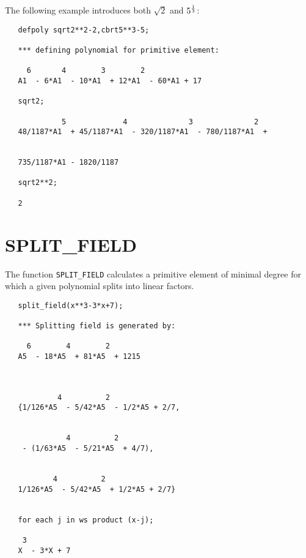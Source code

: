 The following example introduces both $\sqrt 2$ and $5^{1 \over 3}$:

\begin{verbatim}
   defpoly sqrt2**2-2,cbrt5**3-5;

   *** defining polynomial for primitive element:

     6       4        3        2
   A1  - 6*A1  - 10*A1  + 12*A1  - 60*A1 + 17

   sqrt2;

             5             4              3              2
   48/1187*A1  + 45/1187*A1  - 320/1187*A1  - 780/1187*A1  +


   735/1187*A1 - 1820/1187

   sqrt2**2;

   2
\end{verbatim}

\section{SPLIT\_FIELD}

The function {\tt SPLIT\_FIELD} calculates a primitive element of
minimal degree for which a given polynomial splits into linear
factors.

\begin{verbatim}
   split_field(x**3-3*x+7);

   *** Splitting field is generated by:

     6        4        2
   A5  - 18*A5  + 81*A5  + 1215



            4          2
   {1/126*A5  - 5/42*A5  - 1/2*A5 + 2/7,


              4          2
    - (1/63*A5  - 5/21*A5  + 4/7),


           4          2
   1/126*A5  - 5/42*A5  + 1/2*A5 + 2/7}


   for each j in ws product (x-j);

    3
   X  - 3*X + 7
\end{verbatim}

